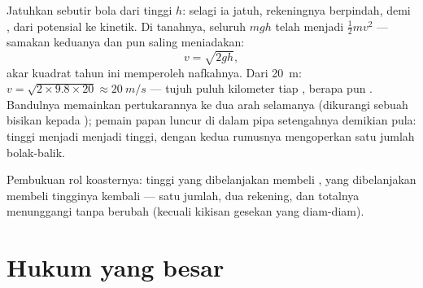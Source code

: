 \begin{example}\label{ex:g9:energy-conversions:trade}
Jatuhkan sebutir bola dari tinggi $h$: selagi ia jatuh, rekeningnya
berpindah,  demi , dari potensial ke kinetik. Di tanahnya,
seluruh $m g h$ telah menjadi $\frac12 m v^2$ --- samakan keduanya dan
 pun saling meniadakan:
\[
v = \sqrt{2 g h},
\]
akar kuadrat tahun ini memperoleh nafkahnya. Dari \qty{20}{m}:
$v = \sqrt{2 \times 9.8 \times 20} \approx \qty{20}{m/s}$ ---
tujuh puluh kilometer tiap , berapa pun . Bandulnya
memainkan pertukarannya ke dua arah selamanya (dikurangi sebuah
bisikan kepada ); pemain papan luncur di dalam pipa
setengahnya demikian pula: tinggi menjadi  menjadi tinggi,
dengan kedua rumusnya mengoperkan satu jumlah bolak-balik.
\end{example}

\begin{omfigure}

{\small Pembukuan rol koasternya: tinggi yang dibelanjakan membeli
,  yang dibelanjakan membeli tingginya kembali --- satu
jumlah, dua rekening, dan totalnya menunggangi tanpa berubah (kecuali
kikisan gesekan yang diam-diam).}
\end{omfigure}

\section{Hukum yang besar}

